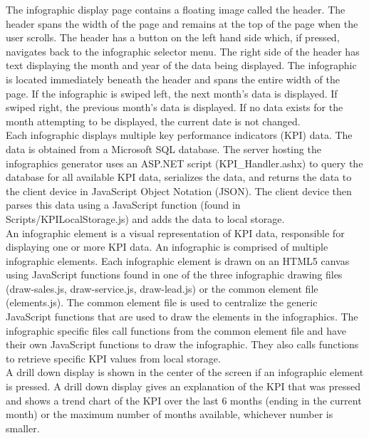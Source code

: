 \documentclass[11pt,a4paper,oneside]{article}
\begin{document}
The infographic display page contains a floating image called the header.  The header spans the width of the page and remains at the top of the page when the user scrolls.  The header has a button on the left hand side which, if pressed, navigates back to the infographic selector menu.  The right side of the header has text displaying the month and year of the data being displayed.  The infographic is located immediately beneath the header and spans the entire width of the page.  If the infographic is swiped left, the next month's data is displayed.  If swiped right, the previous month's data is displayed.  If no data exists for the month attempting to be displayed, the current date is not changed.\\


Each infographic displays multiple key performance indicators (KPI) data. The data is obtained from a Microsoft SQL database. The server hosting the infographics generator uses an ASP.NET script (KPI\_Handler.ashx) to query the database for all available KPI data, serializes the data, and returns the data to the client device in JavaScript Object Notation (JSON).  The client device then parses this data using a JavaScript function (found in Scripts/KPILocalStorage.js) and adds the data to local storage.\\


An infographic element is a visual representation of KPI data, responsible for displaying one or more KPI data. An infographic is comprised of multiple infographic elements. Each infographic element is drawn on an HTML5 canvas using JavaScript functions found in one of the three infographic drawing files (draw-sales.js, draw-service.js, draw-lead.js) or the common element file (elements.js). The common element file is used to centralize the generic JavaScript functions that are used to draw the elements in the infographics. The infographic specific files call functions from the common element file and have their own JavaScript functions to draw the infographic. They also calls functions to retrieve specific KPI values from local storage.\\


A drill down display is shown in the center of the screen if an infographic element is pressed.  A drill down display gives an explanation of the KPI that was pressed and shows a trend chart of the KPI over the last 6 months (ending in the current month) or the maximum number of months available, whichever number is smaller.\\
\end{document}
